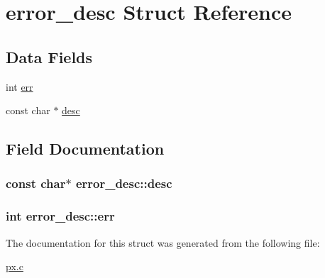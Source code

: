 \hypertarget{structerror__desc}{\section{error\-\_\-desc Struct Reference}
\label{structerror__desc}
}
\subsection*{Data Fields}
\begin{DoxyCompactItemize}
\item 
int \hyperlink{structerror__desc_a8cae12d5e24f7bda4bb2f3da5124a17c}{err}
\item 
const char $\ast$ \hyperlink{structerror__desc_a8bd78a0b6c726e6cf5a8d30c9fead5e3}{desc}
\end{DoxyCompactItemize}


\subsection{Field Documentation}
\hypertarget{structerror__desc_a8bd78a0b6c726e6cf5a8d30c9fead5e3}{
\subsubsection[{desc}]{\setlength{\rightskip}{0pt plus 5cm}const char$\ast$ error\-\_\-desc\-::desc}}\label{structerror__desc_a8bd78a0b6c726e6cf5a8d30c9fead5e3}
\hypertarget{structerror__desc_a8cae12d5e24f7bda4bb2f3da5124a17c}{
\subsubsection[{err}]{\setlength{\rightskip}{0pt plus 5cm}int error\-\_\-desc\-::err}}\label{structerror__desc_a8cae12d5e24f7bda4bb2f3da5124a17c}


The documentation for this struct was generated from the following file\-:\begin{DoxyCompactItemize}
\item 
\hyperlink{px_8c}{px.\-c}\end{DoxyCompactItemize}
